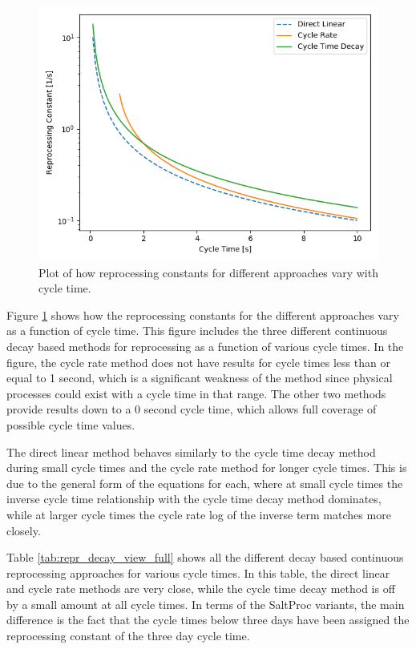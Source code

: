 \begin{figure}[H]
  \centering
  \includegraphics[scale=0.7]{images/cont-compare-cycles.png}
  \caption{Plot of how reprocessing constants for different approaches vary with cycle time.}
   \label{fig:repr_cnst}
\end{figure}

Figure \ref{fig:repr_cnst} shows how the reprocessing constants for the different approaches vary as a function of cycle time.
This figure includes the three different continuous decay based methods for reprocessing as a function of various cycle times. In the figure, the cycle rate method does not have results for cycle times less than or equal to 1 second, which is a significant weakness of the method since physical processes could exist with a cycle time in that range. The other two methods provide results down to a 0 second cycle time, which allows full coverage of possible cycle time values.

The direct linear method behaves similarly to the cycle time decay method during small cycle times and the cycle rate method for longer cycle times. This is due to the general form of the equations for each, where at small cycle times the inverse cycle time relationship with the cycle time decay method dominates, while at larger cycle times the cycle rate log of the inverse term matches more closely.


Table \ref{tab:repr_decay_view_full} shows all the different decay based continuous reprocessing approaches for various cycle times. In this table, the direct linear and cycle rate methods are very close, while the cycle time decay method is off by a small amount at all cycle times. In terms of the SaltProc variants, the main difference is the fact that the cycle times below three days have been assigned the reprocessing constant of the three day cycle time.

